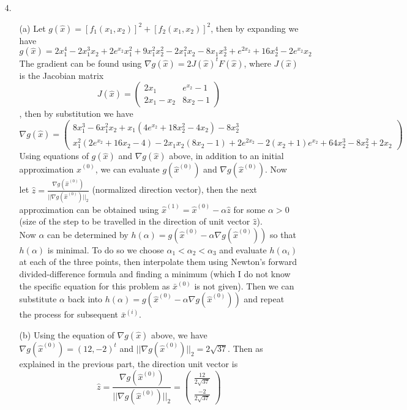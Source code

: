 \documentclass{article}
\begin{document}
\newpage
\begin{itemize}
    \item [4.]
          \begin{itemize}
              \item [(a)]
                    Let $g(\hat{x})=[f_1(x_1,x_2)]^2+[f_2(x_1,x_2)]^2$, then by expanding we have
                    \[g(\hat{x})=2x_1^4-2x_1^3x_2+2e^{x_2}x_1^2+9x_1^2x_2^2-2x_1^2x_2-8x_1x_2^3+e^{2x_2}+16x_2^4-2e^{x_2}x_2\]
                    The gradient can be found using $\nabla g(\hat{x})=2J(\hat{x})^tF(\hat{x})$, where $J(\hat{x})$ is the Jacobian matrix
                    \[J(\hat{x})=\begin{pmatrix}
                            2x_1     & e^{x_2}-1 \\
                            2x_1-x_2 & 8x_2-1
                        \end{pmatrix}\]
                    , then by substitution we have
                    \[\nabla g(\hat{x})=\begin{pmatrix}
                            8x_1^3-6x_1^2x_2+x_1(4e^{x_2}+18x_2^2-4x_2)-8x_2^3 \\
                            x_1^2(2e^{x_2}+16x_2-4)-2x_1x_2(8x_2-1)+2e^{2x_2}-2(x_2+1)e^{x_2}+64x_2^3-8x_2^2+2x_2
                        \end{pmatrix}\]
                    Using equations of $g(\hat{x})$ and $\nabla g(\hat{x})$ above, in addition to an initial approximation $\hat{x}^{(0)}$, we can evaluate $g(\hat{x}^{(0)})$ and $\nabla g(\hat{x}^{(0)})$. Now let $\hat{z}=\frac{\nabla g(\hat{x}^{(0)})}{||\nabla g(\hat{x}^{(0)})||_2}$ (normalized direction vector), then the next approximation can be obtained using $\hat{x}^{(1)}=\hat{x}^{(0)}-\alpha\hat{z}$ for some $\alpha>0$ (size of the step to be travelled in the direction of unit vector $\hat{z}$).\\
                    Now $\alpha$ can be determined by $h(\alpha)=g(\hat{x}^{(0)}-\alpha\nabla g(\hat{x}^{(0)}))$ so that $h(\alpha)$ is minimal. To do so we choose $\alpha_1<\alpha_2<\alpha_3$ and evaluate $h(\alpha_i)$ at each of the three points, then interpolate them using Newton's forward divided-difference formula and finding a minimum (which I do not know the specific equation for this problem as $\bar{x}^{(0)}$ is not given). Then we can substitute $\alpha$ back into $h(\alpha)=g(\hat{x}^{(0)}-\alpha\nabla g(\hat{x}^{(0)}))$ and repeat the process for subsequent $\bar{x}^{(i)}$.
              \item [(b)] Using the equation of $\nabla g(\hat{x})$ above, we have $\nabla g(\hat{x}^{(0)})=(12,-2)^t$ and $||\nabla g(\hat{x}^{(0)})||_2=2\sqrt{37}$. Then as explained in the previous part, the direction unit vector is \[\hat{z}=\frac{\nabla g(\hat{x}^{(0)})}{||\nabla g(\hat{x}^{(0)})||_2}=\begin{pmatrix}
                            \frac{12}{2\sqrt{37}} \\
                            \frac{-2}{2\sqrt{37}}
                        \end{pmatrix}\]
          \end{itemize}
\end{itemize}
\end{document}
